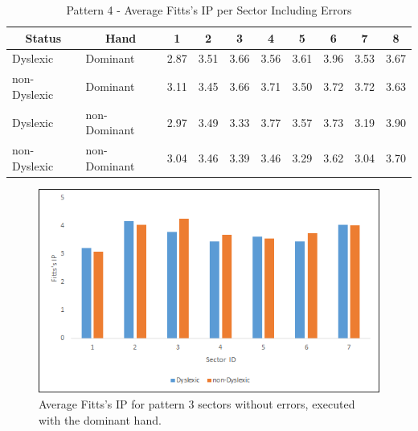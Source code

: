 	\begin{table}[h]
		\centering
		\caption{Pattern 4 - Average Fitts's IP per Sector Including Errors}
		\label{tab_pat_4_ip_all}
		\begin{tabularx}{\textwidth}{|l|l|X|X|X|X|X|X|X|X|}
			\hline
			\multicolumn{1}{|c|}{\textbf{Status}} & \multicolumn{1}{c|}{\textbf{Hand}} & \multicolumn{1}{c|}{\textbf{1}} & \multicolumn{1}{c|}{\textbf{2}} & \multicolumn{1}{c|}{\textbf{3}} & \multicolumn{1}{c|}{\textbf{4}} & \multicolumn{1}{c|}{\textbf{5}} & \multicolumn{1}{c|}{\textbf{6}} & \multicolumn{1}{c|}{\textbf{7}} & \multicolumn{1}{c|}{\textbf{8}} \\ \hline
			Dyslexic                              & Dominant                           & 2.87       & 3.51       & 3.66       & 3.56       & 3.61       & 3.96       & 3.53       & 3.67       \\ \hline
			non-Dyslexic                          & Dominant                           & 3.11       & 3.45       & 3.66       & 3.71       & 3.50       & 3.72       & 3.72       & 3.63       \\ \hline
			Dyslexic                              & non-Dominant                       & 2.97       & 3.49       & 3.33       & 3.77       & 3.57       & 3.73       & 3.19       & 3.90       \\ \hline
			non-Dyslexic                          & non-Dominant                       & 3.04       & 3.46       & 3.39       & 3.46       & 3.29       & 3.62       & 3.04       & 3.70       \\ \hline
		\end{tabularx}
	\end{table}

	\begin{figure}[h]
		\centering
		\includegraphics[width = \textwidth]{../images/pat_3_ip_val_dom}
		\caption{Average Fitts's IP for pattern 3 sectors without errors, executed with the dominant hand.}
		\label{fi_pat_3_ip_dom}
	\end{figure}		

